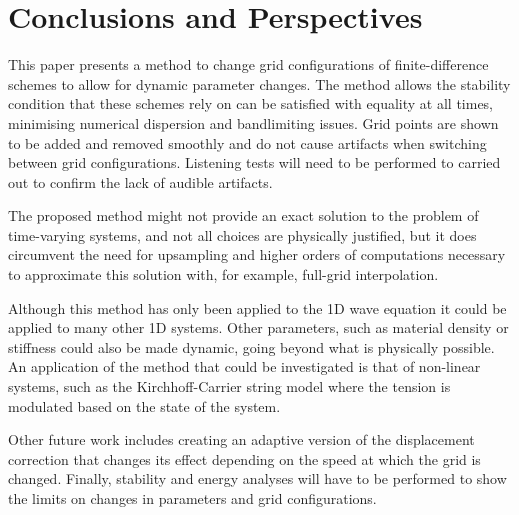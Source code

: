 \section{Conclusions and Perspectives}\label{sec:conclusion}
This paper presents a method to change grid configurations of finite-difference schemes to allow for dynamic parameter changes. The method allows the stability condition that these schemes rely on can be satisfied with equality at all times, minimising numerical dispersion and bandlimiting issues. Grid points are shown to be added and removed smoothly and do not cause artifacts when switching between grid configurations. Listening tests will need to be performed to carried out to confirm the lack of audible artifacts.

The proposed method might not provide an exact solution to the problem of time-varying systems, and not all choices are physically justified, but it does circumvent the need for upsampling and higher orders of computations necessary to approximate this solution with, for example, full-grid interpolation. %
%


Although this method has only been applied to the 1D wave equation it could be applied to many other 1D systems. Other parameters, such as material density or stiffness could also be made dynamic, going beyond what is physically possible. An application of the method that could be investigated is that of non-linear systems, such as the Kirchhoff-Carrier string model \cite{Carrier1945} where the tension is modulated based on the state of the system.

Other future work includes creating an adaptive version of the displacement correction that changes its effect depending on the speed at which the grid is changed. Finally, stability and energy analyses will have to be performed to show the limits on changes in parameters and grid  configurations.
